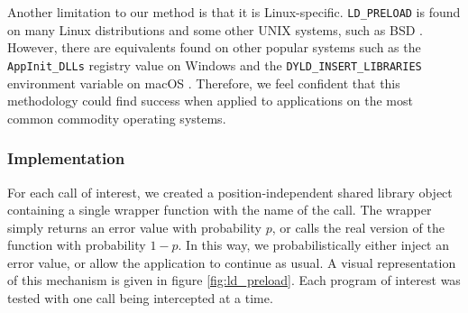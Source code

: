 Another limitation to our method is that it is Linux-specific. \texttt{LD\_PRELOAD} is found on many Linux distributions and some other UNIX systems, such as BSD \cite{bsd}. However, there are equivalents found on other popular systems such as the \texttt{AppInit\_DLLs} registry value on Windows \cite{dll} and the \texttt{DYLD\_INSERT\_LIBRARIES} environment variable on macOS \cite{macos}. Therefore, we feel confident that this methodology could find success when applied to applications on the most common commodity operating systems.

\subsubsection{Implementation}\label{ld_preload_implementation}
For each call of interest, we created a position-independent shared library object containing a single wrapper function with the name of the call. The wrapper simply returns an error value with probability $p$, or calls the real version of the function with probability $1-p$. In this way, we probabilistically either inject an error value, or allow the application to continue as usual. A visual representation of this mechanism is given in figure \ref{fig:ld_preload}. Each program of interest was tested with one call being intercepted at a time.

